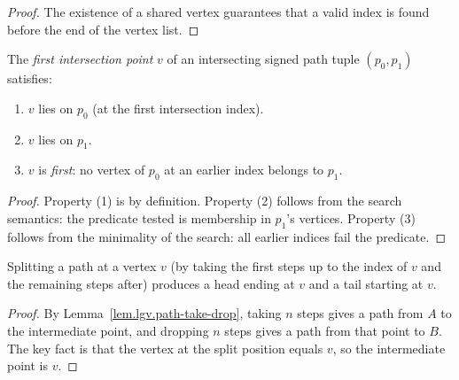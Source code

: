 \begin{proof}
\leanok
The existence of a shared vertex guarantees that a valid index
is found before the end of the vertex list.
\end{proof}

\begin{lemma}
\label{lem.lgv.first-intersection-props}
\leanhelper
\leanok
The \emph{first intersection point} $v$ of an intersecting signed path tuple $(p_0, p_1)$
satisfies:
\begin{enumerate}
\item $v$ lies on $p_0$ (at the first intersection index).
\item $v$ lies on $p_1$.
\item $v$ is \emph{first}: no vertex of $p_0$ at an earlier index belongs to $p_1$.
\end{enumerate}
\end{lemma}

\begin{proof}
Property (1) is by definition. Property (2) follows from the search
semantics: the predicate tested is membership in $p_1$'s vertices.
Property (3) follows from the minimality of the search: all earlier
indices fail the predicate.
\end{proof}

\begin{lemma}
\label{lem.lgv.splitpath-head}
\leanhelper
\leanok
Splitting a path at a vertex $v$ (by taking the first steps up to the
index of $v$ and the remaining steps after) produces a head ending at $v$
and a tail starting at $v$.
\end{lemma}

\begin{proof}
\leanok
By Lemma~\ref{lem.lgv.path-take-drop}, taking $n$ steps gives a path from
$A$ to the intermediate point, and dropping $n$ steps gives a path from
that point to $B$. The key fact is that the vertex at the
split position equals $v$, so the intermediate point is $v$.
\end{proof}

